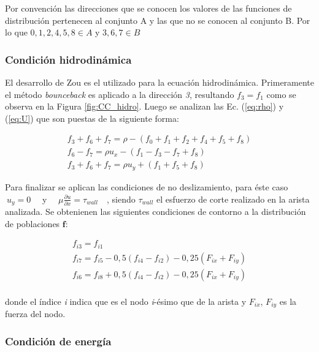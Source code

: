 Por convención las direcciones que se conocen los valores de las funciones de distribución pertenecen al conjunto A y las que no se conocen al conjunto B. Por lo que $ 0, 1, 2, 4, 5, 8 \in A$ y $ 3, 6, 7 \in B$ 


\subsubsection{Condición hidrodinámica}

El desarrollo de Zou \cite{zou1997pressure} es el utilizado para la ecuación hidrodinámica. Primeramente el método \textit{bounceback} es aplicado a la dirección \textit{3}, resultando $f_{3} = f_{1}$ como se observa en la Figura \ref{fig:CC_hidro}. Luego se analizan las Ec. (\ref{eq:rho}) y (\ref{eq:U}) que son puestas de la siguiente forma:

\begin{equation}
	\begin{array}{c}
	f_{3} + f_{6} + f_{7} = \rho - \left( f_{0} + f_{1} + f_{2} + f_{4} + f_{5} + f_{8}	 \right)\\
	f_{6} - f_{7} = \rho u_{x} - \left( f_{1} - f_{3} - f_{7} + f_{8} 	 \right)\\
	f_{3} + f_{6} + f_{7} = \rho u_{y} + \left( f_{1} + f_{5} + f_{8} \right)
	\end{array}
\end{equation}

Para finalizar se aplican las condiciones de no deslizamiento, para éste caso $\> u_{y} = 0\quad$ y $\quad\mu \frac{\partial u}{\partial x} = \tau_{wall}\quad$, siendo $\tau_{wall}$ el esfuerzo de corte realizado en la arista analizada. Se obtenienen las siguientes condiciones de contorno a la distribución de poblaciones $\mathbf{f}$:

\begin{equation}
\begin{array}{c}
f_{i3} = f_{i1}\\
f_{i7} = f_{i5} - 0,5 (f_{i4} - f_{i2}) - 0,25 (F_{ix} + F_{iy})\\
f_{i6} = f_{i8} + 0,5 (f_{i4} - f_{i2}) - 0,25 (F_{ix} + F_{iy})\\
\end{array}
\end{equation}

donde el índice \textit{i} indica que es el nodo \textit{i}-ésimo que de la arista y $F_{ix}$, $F_{iy}$ es la fuerza del nodo. 


\subsubsection{Condición de energía}

